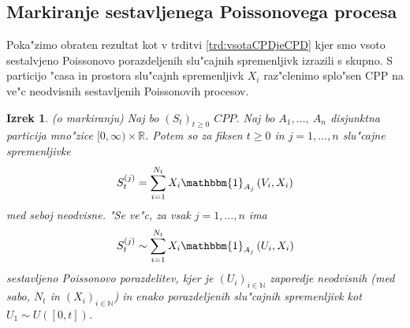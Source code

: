\documentclass[12pt, a4paper, reqno]{amsart}
\theoremstyle{definition}
\theoremstyle{plain}
\newtheorem{izrek}[definicija]{Izrek}
\newcommand{\R}{\mathbb{R}}
\newcommand{\N}{\mathbb{N}}
\newcommand{\1}{\mathds{1}}
\begin{document}
%
%
%
%            

    \subsection{Markiranje sestavljenega Poissonovega procesa}
        Poka"zimo obraten rezultat kot v trditvi \ref{trd:vsotaCPDjeCPD} kjer smo vsoto sestalvjeno Poissonovo 
        porazdeljenih slu"cajnih spremenljivk izrazili s skupno. S particijo "casa in 
        prostora slu"cajnh spremenljivk $X_i$ raz"clenimo splo"sen CPP na ve"c neodvisnih sestavljenih
        Poissonovih procesov.
 
        \begin{izrek}(o markiranju)
            Naj bo $(S_t)_{t\geq0}$ $CPP$. Naj bo $A_1, \dots, \ A_n$ disjunktna particija mno"zice 
            $[0, \infty) \times \R$. Potem so za fiksen $t\geq0$ in $j = 1, \dots, n$ slu"cajne spremenljivke
            \begin{equation}
                S_t^{(j)} = \sum_{i=1}^{N_t}X_i\mathbbm{1}_{A_j}\left(V_i, X_i\right)
                \label{eq:markedCPP}
            \end{equation}
            med seboj neodvisne. "Se ve"c, za vsak $j = 1, \dots, n$ ima
            \begin{equation*}
                S_t^{(j)} \sim \sum_{i=1}^{N_t}X_i\mathbbm{1}_{A_j}\left(U_i, X_i\right)
            \end{equation*}
            sestavljeno Poissonovo porazdelitev, kjer je $(U_i)_{i\in\N}$ zaporedje neodvisnih (med sabo, $N_t$ in $(X_i)_{i\in\N}$) in enako porazdeljenih slu"cajnih spremenljivk
            kot $U_1\sim U\left([0, t]\right)$.
            \label{izr:MarkiranjeCPP}
        \end{izrek}
\end{document}
